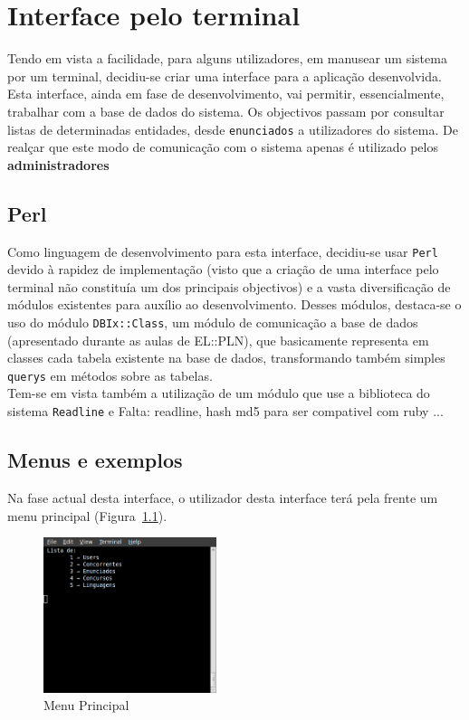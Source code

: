 \chapter{Interface pelo terminal}

Tendo em vista a facilidade, para alguns utilizadores, em manusear um sistema por um terminal, decidiu-se criar uma interface para a aplicação desenvolvida. Esta interface, 
ainda em fase de desenvolvimento, vai permitir, essencialmente, trabalhar com a base de dados do sistema. Os objectivos passam por consultar listas de determinadas entidades, 
desde \texttt{enunciados} a utilizadores do sistema. De realçar que este modo de comunicação com o sistema apenas é utilizado pelos \textbf{administradores}\\

\section{Perl}

Como linguagem de desenvolvimento para esta interface, decidiu-se usar \texttt{Perl} devido à rapidez de implementação (visto que a criação de uma interface pelo terminal não 
constituía um dos principais objectivos) e a vasta diversificação de módulos existentes para auxílio ao desenvolvimento. Desses módulos, destaca-se o uso do módulo 
\texttt{DBIx::Class}, um módulo de comunicação a base de dados (apresentado durante as aulas de EL::PLN), 
que basicamente representa em classes cada tabela existente na base de dados, transformando também simples \texttt{querys} em métodos sobre as tabelas.\\

Tem-se em vista também a utilização de um módulo que use a biblioteca do sistema \texttt{Readline} e \large{Falta: readline, hash md5 para ser compativel com ruby ...}

\section{Menus e exemplos}

Na fase actual desta interface, o utilizador desta interface terá pela frente um menu principal (Figura~\ref{img:menuprinc}). \\

\begin{figure}[H]
\begin{center}
\includegraphics[width=0.45\textwidth]{Images/menuPrinc}
\caption{Menu Principal}\label{img:menuprinc}
\end{center}
\end{figure} 

